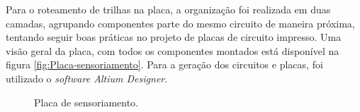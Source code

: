 
Para o roteamento de trilhas na placa, a organização foi realizada
em duas camadas,
agrupando componentes parte do mesmo circuito de maneira próxima, 
tentando seguir boas práticas no projeto de placas de circuito impresso.
Uma visão geral da placa, com todos os componentes montados está 
disponível na figura \ref{fig:Placa-sensoriamento}. Para a geração dos circuitos
e placas, foi utilizado o \textit{software Altium Designer}.
 
\begin{figure}[ht]

    \caption{Placa de sensoriamento.}    
    
    \begin{centering}
    \begin{floatrow}

    
    

\end{floatrow}
\end{centering}
\end{figure}
